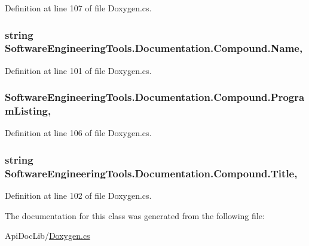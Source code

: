 Definition at line 107 of file Doxygen.\+cs.

\hypertarget{class_software_engineering_tools_1_1_documentation_1_1_compound_ac03a88be9a7e7a11dd3c12006ae65879}{
\subsubsection[{Name}]{\setlength{\rightskip}{0pt plus 5cm}string Software\+Engineering\+Tools.\+Documentation.\+Compound.\+Name\hspace{0.3cm}{\ttfamily [get]}, {\ttfamily [set]}}}\label{class_software_engineering_tools_1_1_documentation_1_1_compound_ac03a88be9a7e7a11dd3c12006ae65879}


Definition at line 101 of file Doxygen.\+cs.

\hypertarget{class_software_engineering_tools_1_1_documentation_1_1_compound_a6682b35f8afccbbecd77f504665b1cb7}{
\subsubsection[{Program\+Listing}]{ Software\+Engineering\+Tools.\+Documentation.\+Compound.\+Program\+Listing\hspace{0.3cm}{\ttfamily [get]}, {\ttfamily [set]}}}\label{class_software_engineering_tools_1_1_documentation_1_1_compound_a6682b35f8afccbbecd77f504665b1cb7}


Definition at line 106 of file Doxygen.\+cs.

\hypertarget{class_software_engineering_tools_1_1_documentation_1_1_compound_a873e7d81cae2f4cb5c6cca41014cd02d}{
\subsubsection[{Title}]{\setlength{\rightskip}{0pt plus 5cm}string Software\+Engineering\+Tools.\+Documentation.\+Compound.\+Title\hspace{0.3cm}{\ttfamily [get]}, {\ttfamily [set]}}}\label{class_software_engineering_tools_1_1_documentation_1_1_compound_a873e7d81cae2f4cb5c6cca41014cd02d}


Definition at line 102 of file Doxygen.\+cs.



The documentation for this class was generated from the following file\+:\begin{DoxyCompactItemize}
\item 
Api\+Doc\+Lib/\hyperlink{_doxygen_8cs}{Doxygen.\+cs}\end{DoxyCompactItemize}
